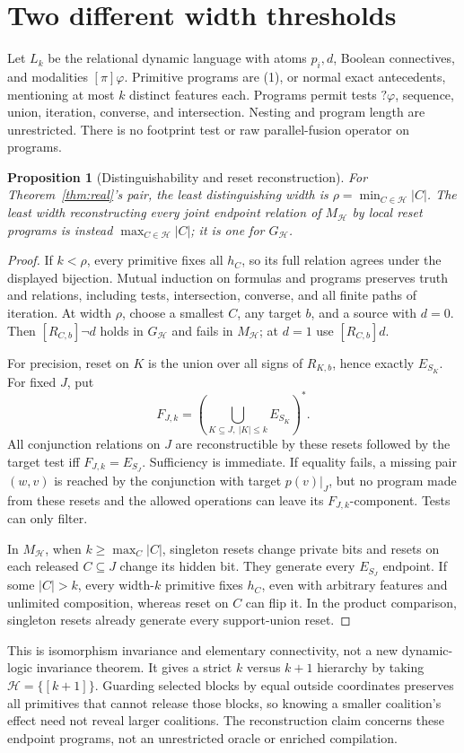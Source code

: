 \documentclass[11pt]{article}
\newtheorem{proposition}[theorem]{Proposition}
\newcommand{\Hh}{\mathcal H}
\begin{document}
\section{Two different width thresholds}
Let $L_k$ be the relational dynamic language with atoms $p_i,d$, Boolean connectives, and modalities $[\pi]\varphi$. Primitive programs are (1), or normal exact antecedents, mentioning at most $k$ distinct features each. Programs permit tests $?\varphi$, sequence, union, iteration, converse, and intersection. Nesting and program length are unrestricted. There is no footprint test or raw parallel-fusion operator on programs.
\begin{proposition}[Distinguishability and reset reconstruction]\label{thm:width}
For Theorem~\ref{thm:real}'s pair, the least distinguishing width is
$\rho=\min_{C\in\Hh}|C|$. The least width reconstructing every joint endpoint relation of $M_{\Hh}$ by local reset programs is instead $\max_{C\in\Hh}|C|$; it is one for $G_{\Hh}$.
\end{proposition}
\begin{proof}
If $k<\rho$, every primitive fixes all $h_C$, so its full relation agrees under the displayed bijection. Mutual induction on formulas and programs preserves truth and relations, including tests, intersection, converse, and all finite paths of iteration. At width $\rho$, choose a smallest $C$, any target $b$, and a source with $d=0$. Then $[R_{C,b}]\neg d$ holds in $G_{\Hh}$ and fails in $M_{\Hh}$; at $d=1$ use $[R_{C,b}]d$.

For precision, reset on $K$ is the union over all signs of $R_{K,b}$, hence exactly $E_{S_K}$. For fixed $J$, put
\[
 F_{J,k}=\left(\bigcup_{K\subseteq J,\ |K|\le k} E_{S_K}\right)^*.
\]
All conjunction relations on $J$ are reconstructible by these resets followed by the target test iff $F_{J,k}=E_{S_J}$. Sufficiency is immediate. If equality fails, a missing pair $(w,v)$ is reached by the conjunction with target $p(v)|_J$, but no program made from these resets and the allowed operations can leave its $F_{J,k}$-component. Tests can only filter.

In $M_{\Hh}$, when $k\ge\max_C|C|$, singleton resets change private bits and resets on each released $C\subseteq J$ change its hidden bit. They generate every $E_{S_J}$ endpoint. If some $|C|>k$, every width-$k$ primitive fixes $h_C$, even with arbitrary features and unlimited composition, whereas reset on $C$ can flip it. In the product comparison, singleton resets already generate every support-union reset.
\end{proof}
This is isomorphism invariance and elementary connectivity, not a new dynamic-logic invariance theorem. It gives a strict $k$ versus $k+1$ hierarchy by taking $\Hh=\{[k+1]\}$. Guarding selected blocks by equal outside coordinates preserves all primitives that cannot release those blocks, so knowing a smaller coalition's effect need not reveal larger coalitions. The reconstruction claim concerns these endpoint programs, not an unrestricted oracle or enriched compilation.
\end{document}
